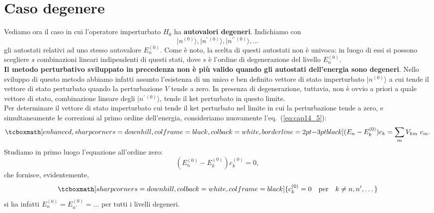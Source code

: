 \section{Caso degenere}
Vediamo ora il caso in cui l'operatore imperturbato $H_0$ ha \textbf{autovalori degeneri}. Indichiamo con
	\begin{equation}
		\vert n^{(0)} \rangle, \vert n^{\prime \,(0)} \rangle, \vert n^{\prime \prime \,(0)} \rangle, \dots
	\end{equation}
gli autostati relativi ad uno stesso autovalore $E_n ^{(0)}$. Come è noto, la scelta di questi autostati non è univoca: in luogo di essi si possono scegliere $s$ combinazioni lineari indipendenti di questi stati, dove $s$ è l'ordine di degenerazione del livello $E_n ^{(0)}$.\\

\textbf{Il metodo perturbativo sviluppato in precedenza non è più valido quando gli autostati dell'energia sono degeneri}. Nello sviluppo di questo metodo abbiamo infatti assunto l'esistenza di un unico e ben definito vettore di stato imperturbato $\vert n ^{(0)}\rangle$ a cui tende il vettore di stato perturbato quando la perturbazione $V$ tende a zero. In presenza di degenerazione, tuttavia, non è ovvio a priori a quale vettore di stato, combinazione lineare degli $\vert n^{\prime \,(0)}\rangle$, tende il ket perturbato in questo limite.\\

Per determinare il vettore di stato imperturbato cui tende il ket perturbato nel limite in cui la perturbazione tende a zero, e simultaneamente le correzioni al primo ordine dell'energia, consideriamo nuovamente l'eq.~(\ref{eq:cap14_5}):
	\begin{equation}
		\tcboxmath[enhanced, sharp corners=downhill, colframe=black, colback=white, borderline={2pt}{-3pt}{black}]{
			(E_n - E_k ^{(0)}) c_k = \sum _m V_{km}\ c_m.
			}
	\end{equation}
Studiamo in primo luogo l'equazione all'ordine zero:
	\begin{equation}
		\left( E_n ^{(0)} - E_k ^{(0)} \right) c_ k ^{(0)} =0,
	\end{equation}
che fornisce, evidentemente,
	\begin{equation}
		\tcboxmath[sharp corners=downhill, colback=white, colframe=black]{
			c_k ^{(0)} =0\quad \textrm{per} \quad k \neq n, n',\dots
			}
	\end{equation}
si ha infatti $E_n ^{(0)} = E_{n'} ^{(0)} = \dots $ per tutti i livelli degeneri.\\

